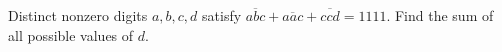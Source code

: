 Distinct nonzero digits $ a,b,c,d $ satisfy $\overline{abc}+\overline{aac}+\overline{ccd}=1111 $. Find the sum of all possible values of $ d $.
